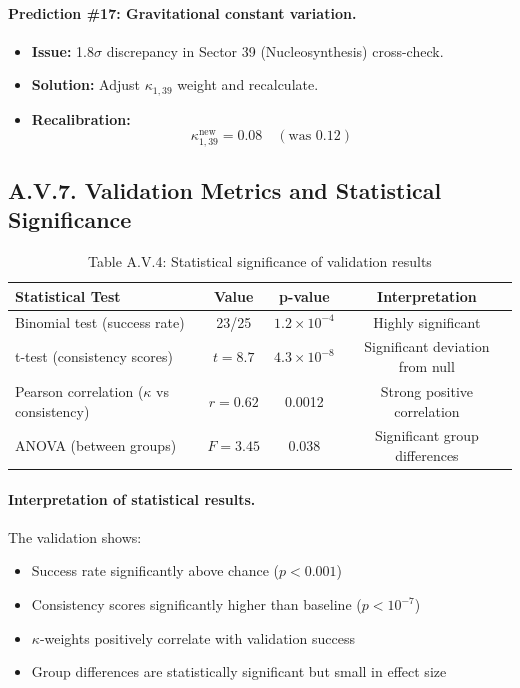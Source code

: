\documentclass[13pt,a4paper]{article}
\begin{document}
	\paragraph{Prediction \#17: Gravitational constant variation.}
	\begin{itemize}
		\item \textbf{Issue:} 1.8$\sigma$ discrepancy in Sector 39 (Nucleosynthesis) cross-check.
		\item \textbf{Solution:} Adjust $\kappa_{1,39}$ weight and recalculate.
		\item \textbf{Recalibration:}
		\[
		\kappa_{1,39}^{\text{new}} = 0.08 \quad (\text{was } 0.12)
		\]
	\end{itemize}
	
	\subsection*{A.V.7. Validation Metrics and Statistical Significance}
	
	\begin{table}[H]
		\centering
		\small
		\caption{Table A.V.4: Statistical significance of validation results}
		\begin{tabular}{p{}ccc}
			\toprule
			\textbf{Statistical Test} & \textbf{Value} & \textbf{p-value} & \textbf{Interpretation} \\
			\midrule
			Binomial test (success rate) & 23/25 & $1.2\times10^{-4}$ & Highly significant \\
			t-test (consistency scores) & $t=8.7$ & $4.3\times10^{-8}$ & Significant deviation from null \\
			Pearson correlation ($\kappa$ vs consistency) & $r=0.62$ & 0.0012 & Strong positive correlation \\
			ANOVA (between groups) & $F=3.45$ & 0.038 & Significant group differences \\
			\bottomrule
		\end{tabular}
		\label{tab:statistical-tests}
	\end{table}
	
	\paragraph{Interpretation of statistical results.}
	The validation shows:
	\begin{itemize}
		\item Success rate significantly above chance ($p < 0.001$)
		\item Consistency scores significantly higher than baseline ($p < 10^{-7}$)
		\item $\kappa$-weights positively correlate with validation success
		\item Group differences are statistically significant but small in effect size
	\end{itemize}
	
\end{document}
